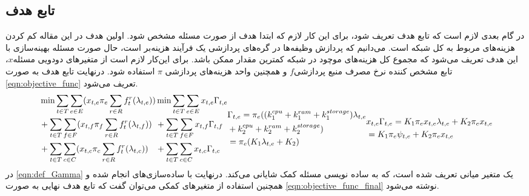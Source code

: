 	\subsection{تابع هدف}
	در گام بعدی لازم است که تابع هدف تعریف شود، برای این کار لازم که ابتدا هدف از صورت مسئله مشخص شود. اولین هدف در این مقاله کم کردن هزینه‌های مربوط به کل شبکه است. می‌دانیم که پردازش وظیفه‌ها در گره‌های پردازشی یک فرآیند هزینه‌بر است، حال صورت مسئله بهینه‌سازی با این هدف تعریف می‌شود که مجموع کل هزینه‌های موچود در شبکه کمترین مقدار ممکن باشد. برای این‌کار لازم است از متغیرهای دودویی مسئله$x$، تابع مشخص کننده نرخ مصرف منبع پردازشی$f$ و همچنین واحد هزینه‌های پردازشی $\pi$ استفاده شود. درنهایت تابع هدف به صورت \cref{eqn:objective_func} تعریف می‌شود. 
	\begin{subequations}\label{eqn:objective_func}
		\begin{align}
		& \notag \min \sum_{t \in T}\sum_{e \in E} (x_{t,e}\pi_e\sum_{r \in R}f_t^r(\lambda_{t,e})) \\
		&\notag + \sum_{t \in T}\sum_{f \in F} (x_{t,f}\pi_f\sum_{r \in R}f_t^r(\lambda_{t,f})) \\
		& + \sum_{t \in T}\sum_{c \in C} (x_{t,c}\pi_c\sum_{r \in R}f_t^r(\lambda_{t,c}))
		\end{align}
		\begin{align}
		& \notag \min \sum_{t \in T}\sum_{e \in E} x_{t,e}\Gamma_{t,e} \\
		& \notag + \sum_{t \in T}\sum_{f \in F} x_{t,f}\Gamma_{t,f} \\
		& + \sum_{t \in T}\sum_{c \in C} x_{t,c}\Gamma_{t,c}
		\end{align}
		\begin{align}\label{eqn:def_Gamma}
		&\notag \Gamma_{t,e} = \pi_e((k_1^{cpu}+k_1^{ram}+k_1^{storage})\lambda_{t,e} \\
		&\notag +k_2^{cpu}+k_2^{ram}+k_2^{storage}) \\
		& = \pi_e(K_1\lambda_{t,e}+K_2)
		\end{align}
		\begin{align}
		&\notag x_{t,e}\Gamma_{t,e} = K_1\pi_ex_{t,e}\lambda_{t,e} + K_2\pi_ex_{t,e} \\
		&= K_1\pi_e\psi_{t,e} + K_2\pi_ex_{t,e}
		\end{align}
	\end{subequations}
	در \cref{eqn:def_Gamma} یک متغیر میانی تعریف شده است، که به ساده نویسی مسئله کمک شایانی می‌کند. 
	درنهایت با ساده‌سازی‌های انجام شده و همچنین استفاده از متغیرهای کمکی می‌توان گفت که تابع هدف نهایی به صورت \cref{eqn:objective_func_final} نوشته می‌شود. 
